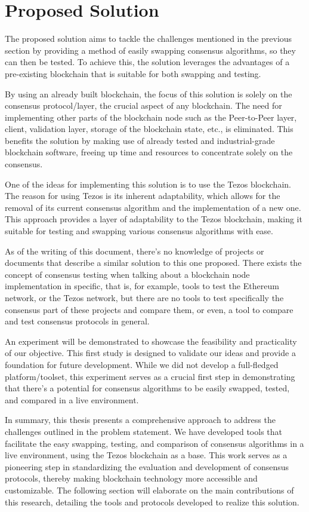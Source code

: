 \section{Proposed Solution}
The proposed solution aims to tackle the challenges mentioned in the previous section by providing a method of easily swapping consensus algorithms, so they can then be tested. To achieve this, the solution leverages the advantages of a pre-existing blockchain that is suitable for both swapping and testing.

By using an already built blockchain, the focus of this solution is solely on the consensus protocol/layer, the crucial aspect of any blockchain. The need for implementing other parts of the blockchain node such as the Peer-to-Peer layer, client, validation layer, storage of the blockchain state, etc., is eliminated. This benefits the solution by making use of already tested and industrial-grade blockchain software, freeing up time and resources to concentrate solely on the consensus.

One of the ideas for implementing this solution is to use the Tezos blockchain. The reason for using Tezos is its inherent adaptability, which allows for the removal of its current consensus algorithm and the implementation of a new one. This approach provides a layer of adaptability to the Tezos blockchain, making it suitable for testing and swapping various consensus algorithms with ease.

As of the writing of this document, there's no knowledge of projects or documents that describe a similar solution to this one proposed. There exists the concept of consensus testing when talking about a blockchain node implementation in specific, that is, for example, tools to test the Ethereum network, or the Tezos network, but there are no tools to test specifically the consensus part of these projects and compare them, or even, a tool to compare and test consensus protocols in general.


An experiment will be demonstrated to showcase the feasibility and practicality of our objective. This first study is designed to validate our ideas and provide a foundation for future development. While we did not develop a full-fledged platform/toolset, this experiment serves as a crucial first step in demonstrating that there's a potential for consensus algorithms to be easily swapped, tested, and compared in a live environment.

In summary, this thesis presents a comprehensive approach to address the challenges outlined in the problem statement. We have developed tools that facilitate the easy swapping, testing, and comparison of consensus algorithms in a live environment, using the Tezos blockchain as a base. This work serves as a pioneering step in standardizing the evaluation and development of consensus protocols, thereby making blockchain technology more accessible and customizable. The following section will elaborate on the main contributions of this research, detailing the tools and protocols developed to realize this solution.



